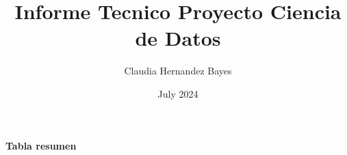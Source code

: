 \documentclass{article}
\title{Informe Tecnico Proyecto Ciencia de Datos}
\author{Claudia Hernandez Bayes}
\date{July 2024}
\begin{document}


\textbf{Tabla resumen}
\end{document}
